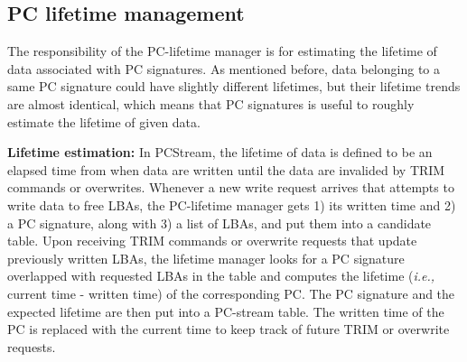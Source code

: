 

\subsection{PC lifetime management}
The responsibility of the PC-lifetime manager is for estimating the lifetime of
data associated with PC signatures. As mentioned before, data belonging to a
same PC signature could have slightly different lifetimes, but their lifetime
trends are almost identical, which means that PC signatures is useful to
roughly estimate the lifetime of given data.

\textbf{Lifetime estimation:}
In \textsf{PCStream}, the lifetime of data is defined to be an elapsed time
from when data are written until the data are invalided by TRIM commands or
overwrites. Whenever a new write request arrives that attempts to write data to
free LBAs, the PC-lifetime manager gets 1) its written time and 2) a PC
signature, along with 3) a list of LBAs, and put them into a candidate table.
Upon receiving TRIM commands or overwrite requests that update previously
written LBAs, the lifetime manager looks for a PC signature overlapped with
requested LBAs in the table and computes the lifetime (\textit{i.e.,} current
time - written time) of the corresponding PC.  The PC signature and the
expected lifetime are then put into a PC-stream table.  The written time of the
PC is replaced with the current time to keep track of future TRIM or overwrite
requests.  

